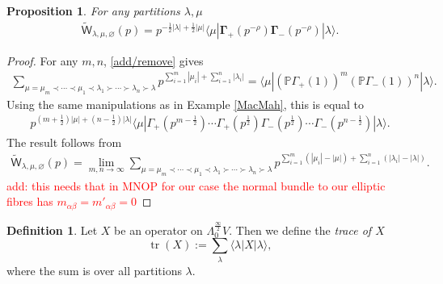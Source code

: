 \documentclass{amsart}
\newtheorem{proposition}[theorem]{Proposition}
\theoremstyle{definition}
\newtheorem{definition}[theorem]{Definition}
\newcommand{\PP} {\mathbb{P}}
\newcommand{\PT}{\mathrm{PT}}
\newcommand{\sfW} {\mathsf{W}}
\newcommand{\tr}{\operatorname{tr}}
\begin{document}
\begin{proposition} \label{2legs}
For any partitions $\lambda, \mu$
\begin{align*}
\tilde{\sfW}_{\lambda,\mu,\varnothing}(p) = p^{-\frac{1}{2} |\lambda| + \frac{1}{2} |\mu|} \langle \mu | \mathbf{\Gamma}_+(p^{-\rho}) \mathbf{\Gamma}_-(p^{-\rho}) | \lambda \rangle.
\end{align*}
\end{proposition}
\begin{proof}
For any $m,n$, \eqref{add/remove} gives
\begin{align*}
\sum_{\mu = \mu_m \prec \cdots \prec \mu_1 \prec \lambda_1 \succ \cdots \succ \lambda_n \succ \lambda} p^{\sum_{i=1}^{m} |\mu_i| + \sum_{i=1}^{n} |\lambda_i|} = \langle \mu | (\PP \Gamma_+(1))^m (\PP \Gamma_-(1))^n | \lambda \rangle.
\end{align*}
Using the same manipulations as in Example \ref{MacMah}, this is equal to
\begin{align*}
p^{(m+\frac{1}{2})|\mu|+(n-\frac{1}{2})|\lambda|} \langle \mu | \Gamma_+(p^{m - \frac{1}{2}}) \cdots \Gamma_+(p^{\frac{1}{2}}) \Gamma_-(p^{\frac{1}{2}}) \cdots \Gamma_-(p^{n - \frac{1}{2}}) | \lambda \rangle.
\end{align*}
The result follows from 
\begin{align*}
\tilde{\sfW}_{\lambda,\mu,\varnothing}(p) = \lim_{m,n \rightarrow \infty} \sum_{\mu = \mu_m \prec \cdots \prec \mu_1 \prec \lambda_1 \succ \cdots \succ \lambda_n \succ \lambda} p^{\sum_{i=1}^{m} (|\mu_i|-|\mu|) + \sum_{i=1}^{n} (|\lambda_i|-|\lambda|)}.
\end{align*}
\textcolor{red}{add: this needs that in MNOP for our case the normal bundle to our elliptic fibres has $m_{\alpha\beta}=m'_{\alpha\beta}=0$}
\end{proof}

\begin{definition}
Let $X$ be an operator on $\Lambda_{0}^{\frac{\infty}{2}}V$. Then we define the \emph{trace of $X$}
$$
\tr(X) := \sum_\lambda \langle \lambda | X | \lambda\rangle,
$$
where the sum is over all partitions $\lambda$.
\end{definition}
\end{document}
